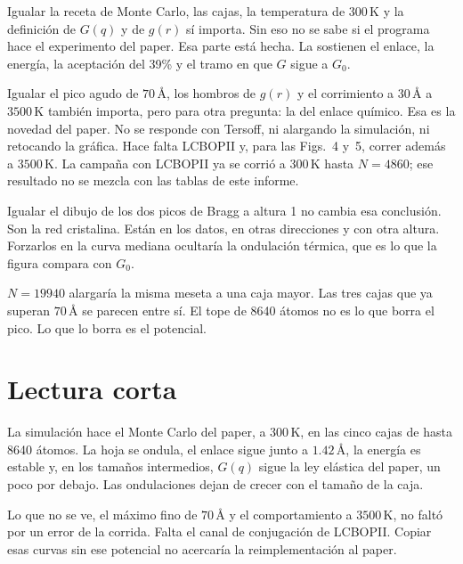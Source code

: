 \documentclass[11pt,a4paper]{article}
\begin{document}
Igualar la receta de Monte Carlo, las cajas, la temperatura de $300\,\mathrm{K}$ y la definición de $G(q)$ y de $g(r)$ sí importa.
Sin eso no se sabe si el programa hace el experimento del paper.
Esa parte está hecha.
La sostienen el enlace, la energía, la aceptación del 39\% y el tramo en que $G$ sigue a $G_0$.

Igualar el pico agudo de $70\,\text{\AA}$, los hombros de $g(r)$ y el corrimiento a $30\,\text{\AA}$ a $3500\,\mathrm{K}$ también importa, pero para otra pregunta: la del enlace químico.
Esa es la novedad del paper.
No se responde con Tersoff, ni alargando la simulación, ni retocando la gráfica.
Hace falta LCBOPII y, para las Figs.~4 y~5, correr además a $3500\,\mathrm{K}$.
La campaña con LCBOPII ya se corrió a $300\,\mathrm{K}$ hasta $N=4860$; ese resultado no se mezcla con las tablas de este informe.

Igualar el dibujo de los dos picos de Bragg a altura 1 no cambia esa conclusión.
Son la red cristalina.
Están en los datos, en otras direcciones y con otra altura.
Forzarlos en la curva mediana ocultaría la ondulación térmica, que es lo que la figura compara con $G_0$.

$N=19940$ alargaría la misma meseta a una caja mayor.
Las tres cajas que ya superan $70\,\text{\AA}$ se parecen entre sí.
El tope de 8640 átomos no es lo que borra el pico.
Lo que lo borra es el potencial.

\enlargethispage{4\baselineskip}
\section{Lectura corta}

La simulación hace el Monte Carlo del paper, a $300\,\mathrm{K}$, en las cinco cajas de hasta 8640 átomos.
La hoja se ondula, el enlace sigue junto a $1.42\,\text{\AA}$, la energía es estable y, en los tamaños intermedios, $G(q)$ sigue la ley elástica del paper, un poco por debajo.
Las ondulaciones dejan de crecer con el tamaño de la caja.

Lo que no se ve, el máximo fino de $70\,\text{\AA}$ y el comportamiento a $3500\,\mathrm{K}$, no faltó por un error de la corrida.
Falta el canal de conjugación de LCBOPII.
Copiar esas curvas sin ese potencial no acercaría la reimplementación al paper.
\end{document}
